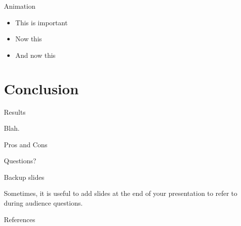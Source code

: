 \documentclass[compress, 10pt]{beamer}
\begin{document}
\begin{frame}{Animation}
  \begin{itemize}[<+- | alert@+>]
    \item \alert<4>{This is important}
    \item Now this
    \item And now this
  \end{itemize}
\end{frame}

\section{Conclusion}

\begin{frame}{Results}

  Blah.

\end{frame}

\begin{frame}{Pros and Cons}
    
\end{frame}

{
\begin{frame}[standout]
  Questions?
\end{frame}
}
\appendix

\begin{frame}[fragile]{Backup slides}

  Sometimes, it is useful to add slides at the end of your presentation to
  refer to during audience questions.
  
\end{frame}

\begin{frame}[allowframebreaks]{References}

  
  

\end{frame}
\end{document}
